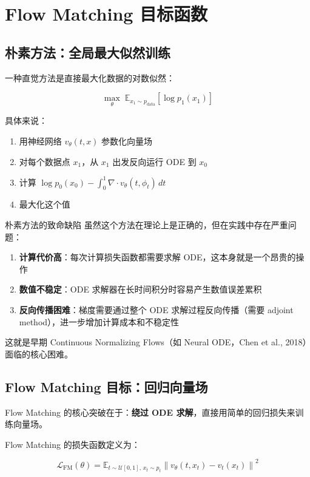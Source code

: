 \section{Flow Matching 目标函数}

\subsection{朴素方法：全局最大似然训练}

一种直觉方法是直接最大化数据的对数似然：

$$\max_\theta \; \mathbb{E}_{x_1 \sim p_{\text{data}}} \left[ \log p_1(x_1) \right]$$

具体来说：
\begin{enumerate}
    \item 用神经网络 $v_\theta(t, x)$ 参数化向量场
    \item 对每个数据点 $x_1$，从 $x_1$ 出发反向运行 ODE 到 $x_0$
    \item 计算 $\log p_0(x_0) - \int_0^1 \nabla \cdot v_\theta(t, \phi_t) \, dt$
    \item 最大化这个值
\end{enumerate}

\begin{warningbox}{朴素方法的致命缺陷}
虽然这个方法在理论上是正确的，但在实践中存在严重问题：
\begin{enumerate}
    \item \textbf{计算代价高}：每次计算损失函数都需要求解 ODE，这本身就是一个昂贵的操作
    \item \textbf{数值不稳定}：ODE 求解器在长时间积分时容易产生数值误差累积
    \item \textbf{反向传播困难}：梯度需要通过整个 ODE 求解过程反向传播（需要 adjoint method），进一步增加计算成本和不稳定性
\end{enumerate}
这就是早期 Continuous Normalizing Flows（如 Neural ODE，Chen et al., 2018）面临的核心困难。
\end{warningbox}

\subsection{Flow Matching 目标：回归向量场}

Flow Matching 的核心突破在于：\textbf{绕过 ODE 求解}，直接用简单的回归损失来训练向量场。

Flow Matching 的损失函数定义为：

$$\mathcal{L}_{\text{FM}}(\theta) = \mathbb{E}_{t \sim \mathcal{U}[0,1], \, x_t \sim p_t} \left\| v_\theta(t, x_t) - v_t(x_t) \right\|^2$$


